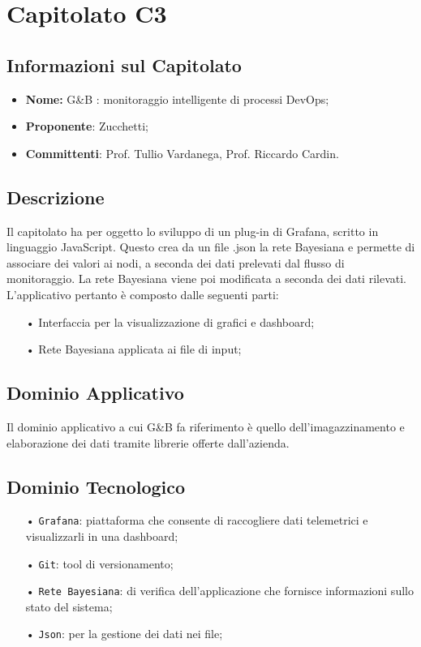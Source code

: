 \section{Capitolato C3}

\subsection{Informazioni sul Capitolato}

\begin{itemize}
	\item \textbf{Nome:} G\&{B} : monitoraggio intelligente di processi DevOps;
	\item \textbf{Proponente}: Zucchetti;
	\item \textbf{Committenti}: Prof. Tullio Vardanega, Prof. Riccardo Cardin.
\end{itemize}

\subsection{Descrizione}
Il capitolato ha per oggetto lo sviluppo di un plug-in di Grafana, scritto in linguaggio JavaScript. Questo crea da un file .json la rete Bayesiana e permette di associare dei valori ai nodi, a seconda dei dati prelevati dal flusso di monitoraggio.
La rete Bayesiana viene poi modificata a seconda dei dati rilevati. 
L'applicativo pertanto è composto dalle seguenti parti: 

\begin{itemize}

\item[•] Interfaccia per la visualizzazione di grafici e dashboard;
\item[•] Rete Bayesiana applicata ai file di input;

\end{itemize}

\subsection{Dominio Applicativo}
Il dominio applicativo a cui G\&{B} fa riferimento è quello dell'imagazzinamento e elaborazione dei dati tramite librerie offerte dall'azienda. 

\subsection{Dominio Tecnologico}
\begin{itemize}

\item[•] \texttt{Grafana}: piattaforma che consente di raccogliere dati telemetrici e visualizzarli in una dashboard;
\item[•] \texttt{Git}: tool di versionamento;
\item[•] \texttt{Rete Bayesiana}: di verifica dell'applicazione che fornisce informazioni sullo stato del sistema;
\item[•] \texttt{Json}: per la gestione dei dati nei file;

\end{itemize}

